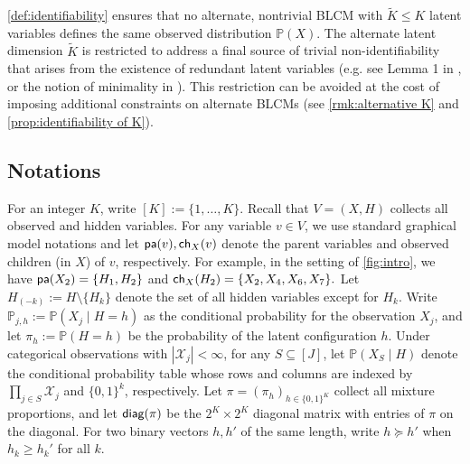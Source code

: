 \documentclass[10pt]{article} %
\newcommand{\PP}{\mathbb P}
\newcommand{\pa}{\textsf{\upshape pa}}
\newcommand{\ch}{\textsf{\upshape ch}}
\newcommand{\diag}{\textsf{\upshape diag}}
\def\tilde{\widetilde}
\begin{document}
%
%
%
%
%
%
%
       
%

%
    
%
    
%
%
%
%
%
%
%
%
%
%
%
%
       
%
%

%

%
    
%

%
    
%
%
%
%
%
%
%

%
%
%


%
%
\cref{def:identifiability} ensures that no alternate, nontrivial BLCM with $\tilde{K} \le K$ latent variables defines the same observed distribution $\PP(X)$. 
The alternate latent dimension $\tilde{K}$ is restricted to address a final source of trivial non-identifiability that arises from the existence of redundant latent variables (e.g. see Lemma 1 in \cite{evans2016graphs}, or the notion of minimality in \cite{markham2020measurement}). This restriction can be avoided at the cost of imposing additional constraints on alternate BLCMs (see \cref{rmk:alternative K} and \cref{prop:identifiability of K}). %

%


%

%
%
%
%
%
%
%
%
%
%
%



\subsection{Notations}\label{sec:notation}
For an integer $K$, write $[K] := \{1, \ldots, K\}$.
Recall that $V = (X, H)$ collects all observed and hidden variables. For any variable $v \in V$, we use standard graphical model notations and let $\pa(v), \ch_X(v)$ denote the parent variables and observed children (in $X$) of $v$, respectively. For example, in the setting of \cref{fig:intro}, we have $\pa(X_2) = \{H_1,H_2\}$ and $\ch_X(H_2) = \{X_2, X_4, X_6, X_{7}\}.$
Let $H_{(-k)} := H \setminus \{H_k\}$ denote the set of all hidden variables except for $H_k$. 
Write $\PP_{j, h} := \PP(X_j \mid H = h)$ as the conditional probability for the observation $X_j$, and let $\pi_h := \PP(H = h)$ be the probability of the latent configuration $h$. {Under categorical observations with $|\mathcal{X}_j|<\infty$, for any $S \subseteq [J]$, let $\PP(X_S \mid H)$ denote the conditional probability table whose rows and columns are indexed by $\prod_{j \in S} \mathcal{X}_j$ and $\{0,1\}^k$, respectively.}
Let $\pi = (\pi_h)_{h \in \{0,1\}^K}$ collect all mixture proportions, and let $\diag(\pi)$ be the $2^K \times 2^K$ diagonal matrix with entries of $\pi$ on the diagonal. %
For two binary vectors $h, h'$ of the same length, write $h \succeq h'$ when $h_k \ge h_k'$ for all $k$. 
\end{document}
